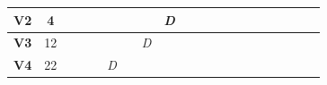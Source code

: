 \documentclass[pdflatex,sn-mathphys]{sn-jnl}%
\begin{document}
\begin{table}[tbh]
\begin{adjustbox}{width=\textwidth}
\begin{tabular}{|cc|ccccccc|ccccccc|ccccccc|}
\multicolumn{1}{|c|}{\textbf{V2}}                       & 4                                & \multicolumn{1}{c|}{}             & \multicolumn{1}{c|}{}             & \multicolumn{1}{c|}{}             & \multicolumn{1}{c|}{}             & \multicolumn{1}{c|}{}             & \multicolumn{1}{c|}{}             & \textit{D}   & \multicolumn{4}{c|}{}                                                                                                                         & \multicolumn{1}{c|}{}             & \multicolumn{1}{c|}{}             &              & \multicolumn{1}{c|}{}             & \multicolumn{1}{c|}{}             & \multicolumn{1}{c|}{}             & \multicolumn{1}{c|}{}             & \multicolumn{1}{c|}{}             & \multicolumn{1}{c|}{}             &              \\ \hline
\multicolumn{1}{|c|}{\textbf{V3}}                       & 12                               & \multicolumn{1}{c|}{}             & \multicolumn{1}{c|}{}             & \multicolumn{1}{c|}{}             & \multicolumn{1}{c|}{}             & \multicolumn{1}{c|}{}             & \multicolumn{1}{c|}{\textit{D}}   &              & \multicolumn{7}{c|}{}                                                                                                                                                                                                                & \multicolumn{4}{c|}{}                                                                                                                         & \multicolumn{1}{c|}{}             & \multicolumn{1}{c|}{}             &              \\ \hline
\multicolumn{1}{|c|}{\textbf{V4}}                       & 22                               & \multicolumn{1}{c|}{}             & \multicolumn{1}{c|}{}             & \multicolumn{1}{c|}{}             & \multicolumn{1}{c|}{\textit{D}}   & \multicolumn{3}{c|}{}                                                                & \multicolumn{7}{c|}{}                                                                                                                                                                                                                & \multicolumn{4}{c|}{}                                                                                                                         & \multicolumn{1}{c|}{}             & \multicolumn{1}{c|}{}             &              \\ \hline

\end{tabular}
\end{adjustbox}
\end{table}
\end{document}
